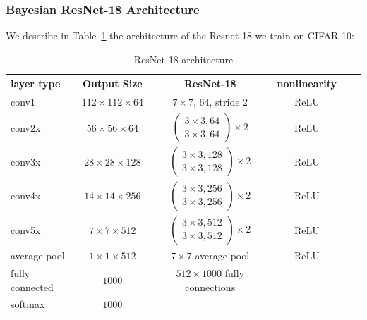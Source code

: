 \documentclass[11pt]{article}
\theoremstyle{t}
\begin{document}
 \subsubsection{Bayesian ResNet-18 Architecture}\label{appendix:resnet}
We describe in Table~\ref{table:resnet} the architecture of the Resnet-18 we train on CIFAR-10:
\begin{table}[H]
\begin{center}
\begin{tabular}{ l c c c c r}
  \hline
  layer type & Output Size & ResNet-18&  nonlinearity \\
  \hline
\textrm{conv1} & $112 \times 112 \times 64$ & $7 \times 7$, $64$, stride 2 & ReLU \\
\textrm{conv2x} & $ 56 \times 56 \times 64$ &$ \begin{pmatrix}
   3 \times 3, 64 \\
   3 \times 3, 64
\end{pmatrix} \times 2$& ReLU \\
\textrm{conv3x} & $ 28 \times 28 \times 128 $& $ \begin{pmatrix}
   3 \times 3, 128 \\
   3 \times 3, 128
\end{pmatrix} \times 2$ & ReLU \\
\textrm{conv4x} & $ 14 \times 14 \times 256$ &$ \begin{pmatrix}
   3 \times 3, 256 \\
   3 \times 3, 256
\end{pmatrix} \times 2$& ReLU \\
\textrm{conv5x} & $ 7 \times 7 \times 512$ &$ \begin{pmatrix}
   3 \times 3, 512 \\
   3 \times 3, 512
\end{pmatrix} \times 2$& ReLU \\
\textrm{average pool} & $ 1 \times 1 \times 512$ & $7 \times 7$ average pool & ReLU \\
\textrm{fully connected} & $1000$ & $512 \times 1000$ fully connections &  \\
\textrm{softmax} & $1000$ &  & \\
  \hline
\end{tabular}
    \caption{ResNet-18 architecture} \label{table:resnet}
\end{center}
\end{table}


 
\end{document}
